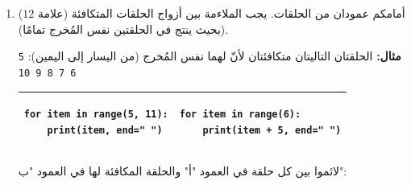 \documentclass[14pt]{extarticle}
\begin{document}
\begin{enumerate}[label=\textbf{السؤال \arabic*:}, wide=0pt, itemsep=2.2em]
\item ($12$ علامة) أمامكم عمودان من الحلقات. يجب الملاءمة بين أزواج الحلقات المتكافئة (بحيث ينتج في الحلقتين نفس المُخرج تمامًا).

\textbf{مثال:} الحلقتان التاليتان متكافئتان لأنّ لهما نفس المُخرج (من اليسار إلى اليمين): \textenglish{\texttt{5 6 7 8 9 10}}

{\renewcommand{\arraystretch}{1.3}
\begin{longtable}{|p{6.5cm}|p{6.5cm}|}
\hline
\begin{pycell}
\begin{english}
\begin{verbatim}
for item in range(5, 11):
    print(item, end=" ")
\end{verbatim}
\end{english}
\end{pycell}
&
\begin{pycell}
\begin{english}
\begin{verbatim}
for item in range(6):
    print(item + 5, end=" ")
\end{verbatim}
\end{english}
\end{pycell}
\\ \hline
\end{longtable}}

لائموا بين كل حلقة في العمود "أ" والحلقة المكافئة لها في العمود "ب":


\end{enumerate}
\end{document}
